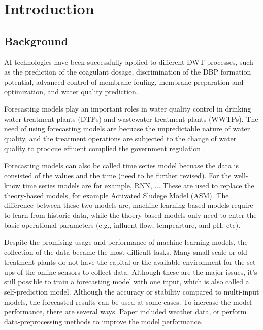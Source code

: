 \chapter{Introduction}

\section{Background}

AI technologies have been successfully applied to different DWT processes, such as the prediction of the coagulant 
dosage, discrimination of the DBP formation potential, advanced control of membrane fouling, membrane preparation 
and optimization, and water quality prediction. \cite{li_recent_2021}

Forecasting models play an important roles in water quality control in drinking water treatment plants (DTPs) 
and wastewater treatment plants (WWTPs). The need of using forecasting models are becuase the unpredictable 
nature of water quality, and the treatment operations are subjected to the change of water quality to prodcue
effluent complied the government regulation \cite{chen_assessing_2003}.

Forecasting models can also be called time series model becuase the data is consisted of the values and the 
time (need to be further revised). For the well-know time series models are for example, RNN, ... These are 
used to replace the theory-based models, for example Activated Sludege Model (ASM). The difference between 
these two models are, machine learning based models require to learn from historic data, while the thoery-based
models only need to enter the basic operational parameters (e.g., influent flow, tempearture, and pH, etc).

Despite the promising usage and performance of machine learning models, the collection of the data became
the most difficult tasks. Many small scale or old treatment plants do not have the capital or the available
environment for the set-ups of the online sensors to collect data.
Although these are the major issues, it's still possible to train a forecasting model with one input, which 
is also called a self-prediction model. Although the accuracy or stability compared to multi-input models, 
the forecasted results can be used at some cases. To increase the model performance, there are several ways.
Paper included weather data, or perform data-preprocessing methods to improve the model performance.


